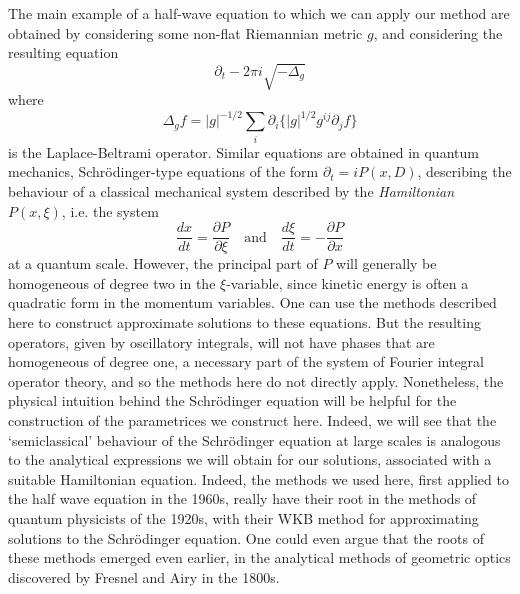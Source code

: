 \documentclass{article}
\theoremstyle{plain}
\theoremstyle{remark}
\theoremstyle{definition}
\begin{document}

The main example of a half-wave equation to which we can apply our method are obtained by considering some non-flat Riemannian metric $g$, and considering the resulting equation
%
\[ \partial_t - 2 \pi i \sqrt{-\Delta_g} \]
%
where
%
\[ \Delta_g f = |g|^{-1/2} \sum_i \partial_i \{ |g|^{1/2} g^{ij} \partial_j f \} \]
%
is the Laplace-Beltrami operator. Similar equations are obtained in quantum mechanics, Schr\"{o}dinger-type equations of the form $\partial_t = i P(x,D)$, describing the behaviour of a classical mechanical system described by the \emph{Hamiltonian} $P(x,\xi)$, i.e. the system
%
\[ \frac{dx}{dt} = \frac{\partial P}{\partial \xi} \quad\text{and}\quad \frac{d\xi}{dt} = - \frac{\partial P}{\partial x} \]
%
at a quantum scale. However, the principal part of $P$ will generally be homogeneous of degree two in the $\xi$-variable, since kinetic energy is often a quadratic form in the momentum variables. One can use the methods described here to construct approximate solutions to these equations. But the resulting operators, given by oscillatory integrals, will not have phases that are homogeneous of degree one, a necessary part of the system of Fourier integral operator theory, and so the methods here do not directly apply. Nonetheless, the physical intuition behind the Schr\"{o}dinger equation will be helpful for the construction of the parametrices we construct here. Indeed, we will see that the `semiclassical' behaviour of the Schr\"{o}dinger equation at large scales is analogous to the analytical expressions we will obtain for our solutions, associated with a suitable Hamiltonian equation. Indeed, the methods we used here, first applied to the half wave equation in the 1960s, really have their root in the methods of quantum physicists of the 1920s, with their WKB method for approximating solutions to the Schr\"{o}dinger equation. One could even argue that the roots of these methods emerged even earlier, in the analytical methods of geometric optics discovered by Fresnel and Airy in the 1800s.
\end{document}
